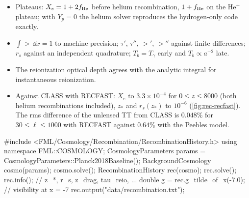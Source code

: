 \begin{validation}
\begin{itemize}
\item Plateaus: $X_e=1+2f_{\rm He}$ before helium recombination, $1+f_{\rm He}$ on the He$^+$ plateau; with $Y_p=0$ the
      helium solver reproduces the hydrogen-only code exactly.
\item $\int\gt\,\dd x=1$ to machine precision; $\tau'$, $\tau''$, $\gt'$, $\gt''$ against finite differences;
      $r_s$ against an independent quadrature; $T_b=T_\gamma$ early and $T_b\propto a^{-2}$ late.
\item The reionization optical depth agrees with the analytic integral for instantaneous reionization.
\item Against CLASS with RECFAST: $X_e$ to $3.3\times10^{-4}$ for $0\le z\le8000$ (both helium recombinations
      included), $z_*$ and $r_s(z_*)$ to $10^{-6}$ (\cref{fig:rec-recfast}). The rms difference of the unlensed TT
      from CLASS is $0.048\%$ for $30\le\ell\le1000$ with RECFAST against $0.64\%$ with the Peebles model.
\end{itemize}
\end{validation}

\begin{cppcode}
#include <FML/Cosmology/Recombination/RecombinationHistory.h>
using namespace FML::COSMOLOGY;
CosmologyParameters params = CosmologyParameters::Planck2018Baseline();
BackgroundCosmology cosmo(params);
cosmo.solve();
RecombinationHistory rec(cosmo);
rec.solve();
rec.info();                               // z_*, r_s, z_drag, tau_reio, ...
double g = rec.g_tilde_of_x(-7.0);        // visibility at x = -7
rec.output("data/recombination.txt");
\end{cppcode}
